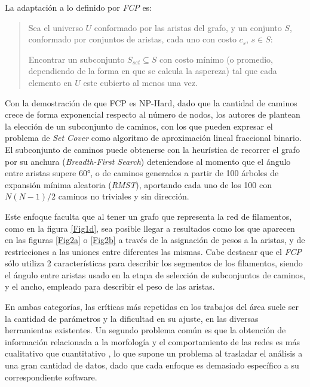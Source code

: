 \documentclass{article}
\begin{document}
La adaptaci\'on a lo definido por {\it FCP} es: 
\begin{quote}
Sea el universo $U$ conformado por las aristas del grafo, y un conjunto $S$, conformado por conjuntos de aristas, cada uno con costo $c_s$, $s \in S$:

Encontrar un subconjunto $S_{set} \subseteq S$ con costo m\'inimo (o promedio, dependiendo de la forma en que se calcula la aspereza) tal que cada elemento en $U$ este cubierto al menos una vez.
\end{quote}

Con la demostraci\'on de que FCP es NP-Hard, dado que la cantidad de caminos crece de forma exponencial respecto al n\'umero de nodos, los autores de \cite{breuer2015define} plantean la elecci\'on de un subconjunto de caminos, con los que pueden expresar el problema de {\it Set Cover} como algoritmo de aproximaci\'on lineal fraccional binario. El subconjunto de caminos puede obtenerse con la heur\'istica de recorrer el grafo por su anchura ({\it Breadth-First Search}) deteniendose al momento que el \'angulo entre aristas supere 60$°$, o de caminos generados a partir de 100 \'arboles de expansi\'on m\'inima aleatoria ({\it RMST}), aportando cada uno de los 100 con $N(N-1)/2$ caminos no triviales y sin direcci\'on. 

Este enfoque faculta que al tener un grafo que representa la red de filamentos, como en la figura \ref{Fig1d}, sea posible llegar a resultados como los que aparecen en las figuras \ref{Fig2a} o \ref{Fig2b} a trav\'es de la asignaci\'on de pesos a la aristas, y de restricciones a las uniones entre diferentes las mismas. Cabe destacar que el {\it FCP} s\'olo utiliza 2 caracter\'isticas para describir los segmentos de los filamentos, siendo el \'angulo entre aristas usado en la etapa de selecci\'on de subconjuntos de caminos, y el ancho, empleado para describir el peso de las aristas.  

En ambas categor\'ias, las cr\'iticas m\'as repetidas en los trabajos del \'area suele ser la cantidad de par\'ametros y la dificultad en su ajuste, en las diversas herramientas existentes. Un segundo problema com\'un es que la obtenci\'on de informaci\'on relacionada a la morfolog\'ia y el comportamiento de las redes es m\'as cualitativo que cuantitativo \cite{asgharzadeh2018computational}\cite{qiu2014quantitative}, lo que supone un problema al trasladar el  an\'alisis a una gran cantidad de datos, dado que cada enfoque es demasiado espec\'ifico a su correspondiente software.
\end{document}
